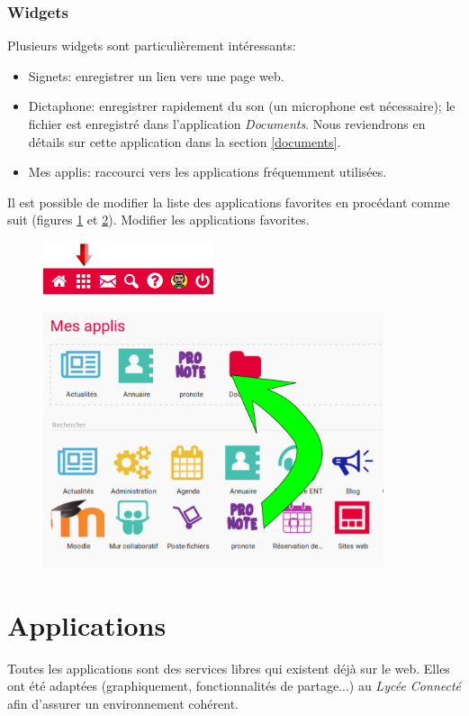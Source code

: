 \documentclass[a4paper,11pt]{article}
\begin{document}
\begin{Form}
\subsubsection{Widgets}
Plusieurs widgets sont particulièrement intéressants:
\begin{itemize}
\item Signets: enregistrer un lien vers une page web.
\item Dictaphone: enregistrer rapidement du son (un microphone est nécessaire); le fichier est enregistré dans l'application \emph{Documents}. Nous reviendrons en détails sur cette application dans la section \ref{documents}.
\item Mes applis: raccourci vers les applications fréquemment utilisées. 
\end{itemize}
\begin{activite}
Il est possible de modifier la liste des applications favorites en procédant comme suit (figures \ref{appacces} et \ref{app}). Modifier les applications favorites.
\end{activite}
\begin{figure}[!h]
\centering
\includegraphics[width=5cm]{ressources/bandeauapp.png}
\label{appacces}
\end{figure}
\begin{figure}[!h]
\centering
\includegraphics[width=10cm]{ressources/glisser.png}
\label{app}
\end{figure}
\section{Applications}
Toutes les applications sont des services libres qui existent déjà sur le web. Elles ont été adaptées (graphiquement, fonctionnalités de partage...) au \emph{Lycée Connecté} afin d'assurer un environnement cohérent.

\end{Form}
\end{document}
